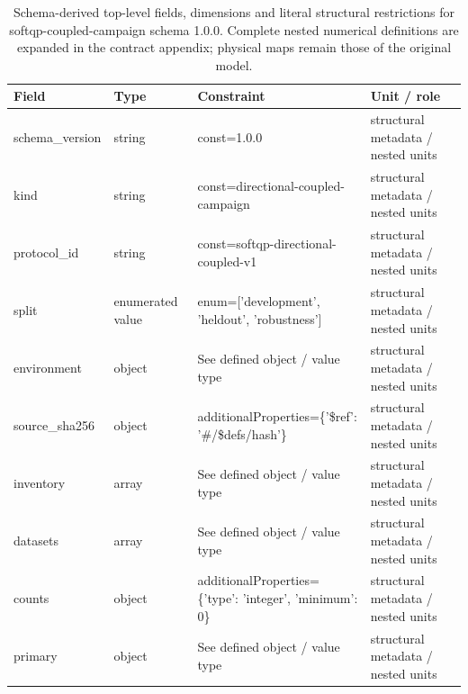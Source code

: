 \begin{table}[htbp]\centering\footnotesize
\caption{Schema-derived top-level fields, dimensions and literal structural restrictions for softqp-coupled-campaign schema 1.0.0. Complete nested numerical definitions are expanded in the contract appendix; physical maps remain those of the original model.}\label{tab:contract-softqp-coupled-campaign} %
\begin{tabularx}{\textwidth}{@{}>{\raggedright\arraybackslash}p{}>{\raggedright\arraybackslash}p{}>{\raggedright\arraybackslash}X>{\raggedright\arraybackslash}X@{}}\toprule
Field & Type & Constraint & Unit / role\\\midrule
schema\_\allowbreak{}version & string & const=\allowbreak{}1.\allowbreak{}0.\allowbreak{}0 & structural metadata /\allowbreak{} nested units\\
kind & string & const=\allowbreak{}directional-\allowbreak{}coupled-\allowbreak{}campaign & structural metadata /\allowbreak{} nested units\\ %
protocol\_\allowbreak{}id & string & const=\allowbreak{}softqp-\allowbreak{}directional-\allowbreak{}coupled-\allowbreak{}v1 & structural metadata /\allowbreak{} nested units\\
split & enumerated value & enum=\allowbreak{}['development', 'heldout', 'robustness'] & structural metadata /\allowbreak{} nested units\\
environment & object & See defined object /\allowbreak{} value type & structural metadata /\allowbreak{} nested units\\
source\_\allowbreak{}sha256 & object & additionalProperties=\allowbreak{}\{'\$ref': '\#/\allowbreak{}\$defs/\allowbreak{}hash'\} & structural metadata /\allowbreak{} nested units\\
inventory & array & See defined object /\allowbreak{} value type & structural metadata /\allowbreak{} nested units\\
datasets & array & See defined object /\allowbreak{} value type & structural metadata /\allowbreak{} nested units\\
counts & object & additionalProperties=\allowbreak{}\{'type': 'integer', 'minimum': 0\} & structural metadata /\allowbreak{} nested units\\
primary & object & See defined object /\allowbreak{} value type & structural metadata /\allowbreak{} nested units\\

\end{tabularx}
\end{table}
